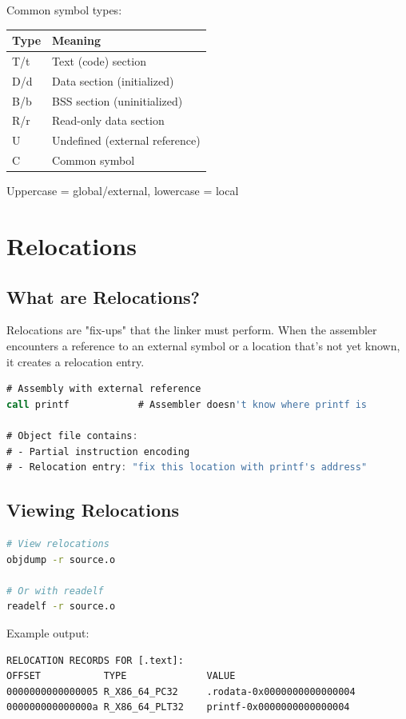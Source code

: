 Common symbol types:

\begin{tabular}{|l|l|}
\hline
\textbf{Type} & \textbf{Meaning} \\
\hline
T/t & Text (code) section \\
\hline
D/d & Data section (initialized) \\
\hline
B/b & BSS section (uninitialized) \\
\hline
R/r & Read-only data section \\
\hline
U & Undefined (external reference) \\
\hline
C & Common symbol \\
\hline
\end{tabular}

Uppercase = global/external, lowercase = local

\section{Relocations}

\subsection{What are Relocations?}

Relocations are "fix-ups" that the linker must perform. When the assembler encounters a reference to an external symbol or a location that's not yet known, it creates a relocation entry.

\begin{lstlisting}[language=nasm]
# Assembly with external reference
call printf            # Assembler doesn't know where printf is

# Object file contains:
# - Partial instruction encoding
# - Relocation entry: "fix this location with printf's address"
\end{lstlisting}

\subsection{Viewing Relocations}

\begin{lstlisting}[language=bash]
# View relocations
objdump -r source.o

# Or with readelf
readelf -r source.o
\end{lstlisting}

Example output:
\begin{verbatim}
RELOCATION RECORDS FOR [.text]:
OFFSET           TYPE              VALUE
0000000000000005 R_X86_64_PC32     .rodata-0x0000000000000004
000000000000000a R_X86_64_PLT32    printf-0x0000000000000004
\end{verbatim}

